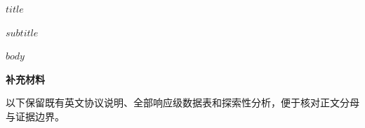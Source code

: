 \documentclass[11pt,a4paper]{article}
\newcommand{\setstretch}[1]{\linespread{#1}\selectfont}
\begin{document}
\begin{center}
{\LARGE\bfseries\color{ChemInk}$title$\par}
\vspace{.6em}
{\normalsize\sffamily\color{ChemInk}$subtitle$\par}
\end{center}
\vspace{.4em}
$body$
\FloatBarrier
\clearpage


\clearpage
\begin{center}{\Large\bfseries 补充材料}\end{center}
\noindent 以下保留既有英文协议说明、全部响应级数据表和探索性分析，便于核对正文分母与证据边界。
\setstretch{1.0}
\setcounter{section}{0}
\setcounter{secnumdepth}{2}
\appendix

\end{document}
